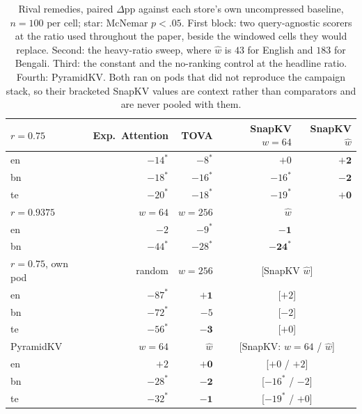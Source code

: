 \documentclass{article}
\begin{document}
\begin{table}[h]
\caption{Rival remedies, paired $\Delta$pp against each store's own
uncompressed baseline, $n{=}100$ per cell; star: McNemar $p<.05$. First block:
two query-agnostic scorers at the ratio used throughout the paper, beside
the windowed cells they would replace. Second: the heavy-ratio sweep,
where $\hat w$ is $43$ for English and $183$ for Bengali. Third: the
constant and the no-ranking control at the headline ratio. Fourth:
PyramidKV. Both ran on pods that did not reproduce the campaign stack,
so their bracketed SnapKV values are context rather than comparators and
are never pooled with them.}
\label{tab:rivals}
\centering
\small
\begin{tabular}{lrrrr}
\toprule
$r{=}0.75$ & Exp.\ Attention & TOVA & SnapKV $w{=}64$ & SnapKV $\hat w$ \\
\midrule
en & ${-}14^{*}$ & ${-}8^{*}$ & ${+}0$ & $\mathbf{{+}2}$ \\
bn & ${-}18^{*}$ & ${-}16^{*}$ & ${-}16^{*}$ & $\mathbf{{-}2}$ \\
te & ${-}20^{*}$ & ${-}18^{*}$ & ${-}19^{*}$ & $\mathbf{{+}0}$ \\
\midrule
$r{=}0.9375$ & $w{=}64$ & $w{=}256$ & $\hat w$ & \\
\midrule
en & ${-}2$ & ${-}9^{*}$ & $\mathbf{{-}1}$ & \\
bn & ${-}44^{*}$ & ${-}28^{*}$ & $\mathbf{{-}24^{*}}$ & \\
\midrule
$r{=}0.75$, own pod & random & $w{=}256$ & \multicolumn{2}{c}{[SnapKV $\hat w$]} \\
\midrule
en & ${-}87^{*}$ & $\mathbf{{+}1}$ & \multicolumn{2}{c}{[${+}2$]} \\
bn & ${-}72^{*}$ & ${-}5$ & \multicolumn{2}{c}{[${-}2$]} \\
te & ${-}56^{*}$ & $\mathbf{{-}3}$ & \multicolumn{2}{c}{[${+}0$]} \\
\midrule
PyramidKV & $w{=}64$ & $\hat w$ & \multicolumn{2}{c}{[SnapKV: $w{=}64$ / $\hat w$]} \\
\midrule
en & ${+}2$ & $\mathbf{{+}0}$ & \multicolumn{2}{c}{[${+}0$ / ${+}2$]} \\
bn & ${-}28^{*}$ & $\mathbf{{-}2}$ & \multicolumn{2}{c}{[${-}16^{*}$ / ${-}2$]} \\
te & ${-}32^{*}$ & $\mathbf{{-}1}$ & \multicolumn{2}{c}{[${-}19^{*}$ / ${+}0$]} \\
\bottomrule
\end{tabular}
\end{table}
\end{document}
